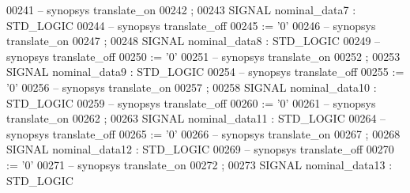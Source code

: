 \begin{DoxyCode}
{00241 \textcolor{keyword}{     -- synopsys translate\_on}
00242      ;
00243      \textcolor{keywordflow}{SIGNAL}  \textcolor{vhdlchar}{nominal_data7}  \textcolor{vhdlchar}{:}   \textcolor{comment}{STD\_LOGIC}
00244 \textcolor{keyword}{     -- synopsys translate\_off}
00245       \textcolor{vhdlchar}{:=} \textcolor{vhdlchar}{'}\textcolor{vhdllogic}{}\textcolor{vhdllogic}{0}\textcolor{vhdlchar}{'}
00246 \textcolor{keyword}{     -- synopsys translate\_on}
00247      ;
00248      \textcolor{keywordflow}{SIGNAL}  \textcolor{vhdlchar}{nominal_data8}  \textcolor{vhdlchar}{:}   \textcolor{comment}{STD\_LOGIC}
00249 \textcolor{keyword}{     -- synopsys translate\_off}
00250       \textcolor{vhdlchar}{:=} \textcolor{vhdlchar}{'}\textcolor{vhdllogic}{}\textcolor{vhdllogic}{0}\textcolor{vhdlchar}{'}
00251 \textcolor{keyword}{     -- synopsys translate\_on}
00252      ;
00253      \textcolor{keywordflow}{SIGNAL}  \textcolor{vhdlchar}{nominal_data9}  \textcolor{vhdlchar}{:}   \textcolor{comment}{STD\_LOGIC}
00254 \textcolor{keyword}{     -- synopsys translate\_off}
00255       \textcolor{vhdlchar}{:=} \textcolor{vhdlchar}{'}\textcolor{vhdllogic}{}\textcolor{vhdllogic}{0}\textcolor{vhdlchar}{'}
00256 \textcolor{keyword}{     -- synopsys translate\_on}
00257      ;
00258      \textcolor{keywordflow}{SIGNAL}  \textcolor{vhdlchar}{nominal_data10} \textcolor{vhdlchar}{:}   \textcolor{comment}{STD\_LOGIC}
00259 \textcolor{keyword}{     -- synopsys translate\_off}
00260       \textcolor{vhdlchar}{:=} \textcolor{vhdlchar}{'}\textcolor{vhdllogic}{}\textcolor{vhdllogic}{0}\textcolor{vhdlchar}{'}
00261 \textcolor{keyword}{     -- synopsys translate\_on}
00262      ;
00263      \textcolor{keywordflow}{SIGNAL}  \textcolor{vhdlchar}{nominal_data11} \textcolor{vhdlchar}{:}   \textcolor{comment}{STD\_LOGIC}
00264 \textcolor{keyword}{     -- synopsys translate\_off}
00265       \textcolor{vhdlchar}{:=} \textcolor{vhdlchar}{'}\textcolor{vhdllogic}{}\textcolor{vhdllogic}{0}\textcolor{vhdlchar}{'}
00266 \textcolor{keyword}{     -- synopsys translate\_on}
00267      ;
00268      \textcolor{keywordflow}{SIGNAL}  \textcolor{vhdlchar}{nominal_data12} \textcolor{vhdlchar}{:}   \textcolor{comment}{STD\_LOGIC}
00269 \textcolor{keyword}{     -- synopsys translate\_off}
00270       \textcolor{vhdlchar}{:=} \textcolor{vhdlchar}{'}\textcolor{vhdllogic}{}\textcolor{vhdllogic}{0}\textcolor{vhdlchar}{'}
00271 \textcolor{keyword}{     -- synopsys translate\_on}
00272      ;
00273      \textcolor{keywordflow}{SIGNAL}  \textcolor{vhdlchar}{nominal_data13} \textcolor{vhdlchar}{:}   \textcolor{comment}{STD\_LOGIC}
}
\end{DoxyCode}
